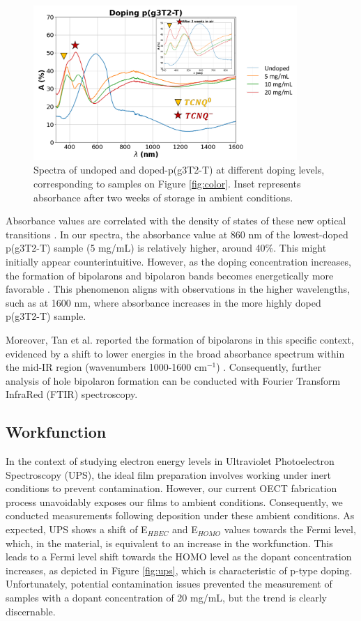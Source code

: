 \begin{figure}[ht]
  \centering
  \includegraphics[width=10cm]{Images/pdf/abs+inlet.pdf}
  \caption[Absorbance spectra of different doping levels of p(g3T2-T)]{Spectra of undoped and doped-p(g3T2-T) at different doping levels, corresponding to samples on Figure \ref{fig:color}. Inset represents absorbance after two weeks of storage in ambient conditions.}
  \label{fig:abs}
\end{figure}

Absorbance values are correlated with the density of states of these new optical transitions \cite{bredasPolaronsBipolaronsSolitons1985}. In our spectra, the absorbance value at 860 nm of the lowest-doped p(g3T2-T) sample (5 mg/mL) is relatively higher, around 40\%. This might initially appear counterintuitive. However, as the doping concentration increases, the formation of bipolarons and bipolaron bands becomes energetically more favorable \cite{enenglDopinginducedAbsorptionBands2016} . This phenomenon aligns with observations in the higher wavelengths, such as at 1600 nm, where absorbance increases in the more highly doped p(g3T2-T) sample.

Moreover, Tan et al. reported the formation of bipolarons in this specific context, evidenced by a shift to lower energies in the broad absorbance spectrum within the mid-IR region (wavenumbers 1000-1600 cm$^{-1}$) \cite{tanTuningOrganicElectrochemical2022}. Consequently, further analysis of hole bipolaron formation can be conducted with Fourier Transform InfraRed (FTIR) spectroscopy.
 
\subsection{Workfunction}

In the context of studying electron energy levels in Ultraviolet Photoelectron Spectroscopy (UPS), the ideal film preparation involves working under inert conditions to prevent contamination. However, our current OECT fabrication process unavoidably exposes our films to ambient conditions. Consequently, we conducted measurements following deposition under these ambient conditions. As expected, UPS shows a shift of E$_{HBEC}$ and E$_{HOMO}$ values towards the Fermi level, which, in the material, is equivalent to an increase in the workfunction. This leads to a Fermi level shift towards the HOMO level as the dopant concentration increases, as depicted in Figure \ref{fig:ups}, which is characteristic of p-type doping. Unfortunately, potential contamination issues prevented the measurement of samples with a dopant concentration of 20 mg/mL, but the trend is clearly discernable.

